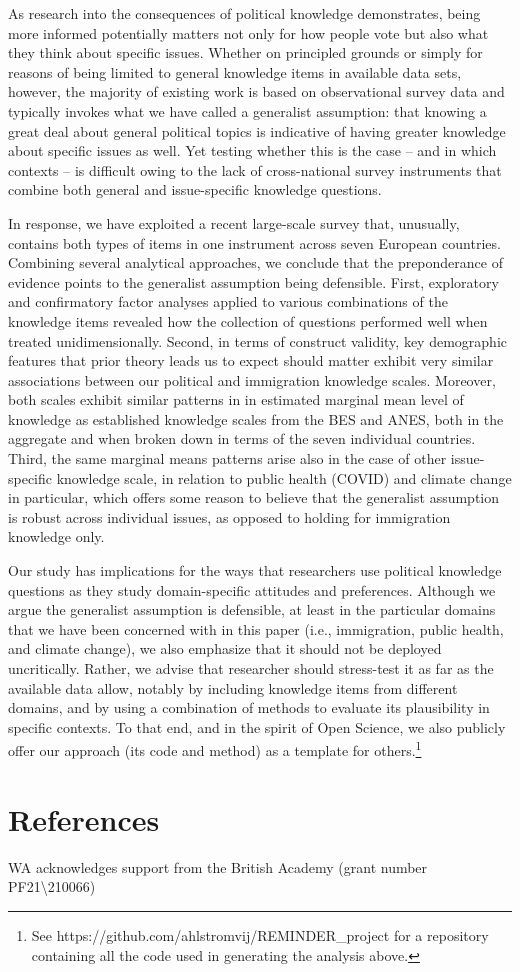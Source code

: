 \documentclass[12pt,halfline,a4paper,]{ouparticle}
\begin{document}
As research into the consequences of political knowledge demonstrates,
being more informed potentially matters not only for how people vote but
also what they think about specific issues. Whether on principled
grounds or simply for reasons of being limited to general knowledge
items in available data sets, however, the majority of existing work is
based on observational survey data and typically invokes what we have
called a generalist assumption: that knowing a great deal about general
political topics is indicative of having greater knowledge about
specific issues as well. Yet testing whether this is the case -- and in
which contexts -- is difficult owing to the lack of cross-national
survey instruments that combine both general and issue-specific
knowledge questions.

In response, we have exploited a recent large-scale survey that,
unusually, contains both types of items in one instrument across seven
European countries. Combining several analytical approaches, we conclude
that the preponderance of evidence points to the generalist assumption
being defensible. First, exploratory and confirmatory factor analyses
applied to various combinations of the knowledge items revealed how the
collection of questions performed well when treated unidimensionally.
Second, in terms of construct validity, key demographic features that
prior theory leads us to expect should matter exhibit very similar
associations between our political and immigration knowledge scales.
Moreover, both scales exhibit similar patterns in in estimated marginal
mean level of knowledge as established knowledge scales from the BES and
ANES, both in the aggregate and when broken down in terms of the seven
individual countries. Third, the same marginal means patterns arise also
in the case of other issue-specific knowledge scale, in relation to
public health (COVID) and climate change in particular, which offers
some reason to believe that the generalist assumption is robust across
individual issues, as opposed to holding for immigration knowledge only.

Our study has implications for the ways that researchers use political
knowledge questions as they study domain-specific attitudes and
preferences. Although we argue the generalist assumption is defensible,
at least in the particular domains that we have been concerned with in
this paper (i.e., immigration, public health, and climate change), we
also emphasize that it should not be deployed uncritically. Rather, we
advise that researcher should stress-test it as far as the available
data allow, notably by including knowledge items from different domains,
and by using a combination of methods to evaluate its plausibility in
specific contexts. To that end, and in the spirit of Open Science, we
also publicly offer our approach (its code and method) as a template for
others.\footnote{See https://github.com/ahlstromvij/REMINDER\_project
  for a repository containing all the code used in generating the
  analysis above.}

\hypertarget{references}{%
\section{References}\label{references}}


\begin{notes}[Acknowledgements]
WA acknowledges support from the British Academy (grant number
PF21\textbackslash210066)
\end{notes}
\end{document}
